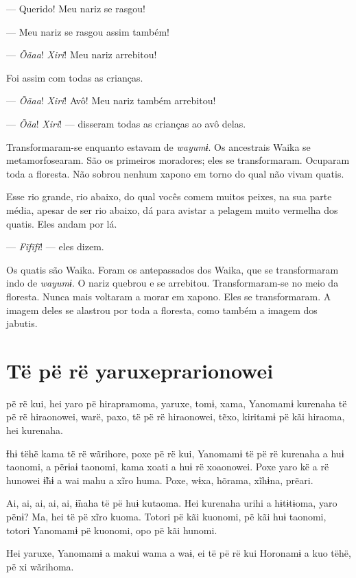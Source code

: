 --- Querido! Meu nariz se rasgou! 

--- Meu nariz se rasgou assim também!

--- \textit{Õãaa}! \textit{Xiri}! Meu nariz arrebitou! 

Foi assim com todas as crianças. 

--- \textit{Õãaa}! \textit{Xiri}! Avô! Meu nariz também arrebitou! 

--- \textit{Õãa}! \textit{Xiri}! --- disseram todas as crianças ao avô delas. 

Transformaram-se enquanto estavam de \textit{wayumɨ}. Os ancestrais Waika
se metamorfosearam. São os primeiros moradores; eles se transformaram.
Ocuparam toda a floresta. Não sobrou nenhum xapono em torno do qual não
vivam quatis. 

Esse rio grande, rio abaixo, do qual vocês comem muitos peixes, na sua
parte média, apesar de ser rio abaixo, dá para avistar a pelagem muito
vermelha dos quatis. Eles andam por lá. 

--- \textit{Fĩfĩfĩ}! --- eles dizem. 

Os quatis são Waika. Foram os antepassados dos Waika, que se
transformaram indo de \textit{wayumɨ}. O nariz quebrou e se arrebitou.
Transformaram-se no meio da floresta. Nunca mais voltaram a morar em
xapono. Eles se transformaram. A imagem deles se alastrou por toda a
floresta, como também a imagem dos jabutis.

\chapter{Të pë rë yaruxeprarionowei}

 pë rë kui, hei yaro pë hirapramoma, yaruxe, tomɨ, xama, Yanomamɨ
kurenaha të pë rë hiraonowei, warë, paxo, të pë rë hiraonowei, tẽxo,
kiritamɨ pë kãi hiraoma, hei kurenaha. 

Ɨhɨ tëhë kama të rë wãrihore, poxe pë rë kui, Yanomamɨ të pë rë kurenaha
a huɨ taonomi, a përɨaɨ taonomi, kama xoati a huɨ rë xoaonowei. Poxe
yaro kë a rë hunowei ɨ̃hɨ a wai mahu a xĩro huma. Poxe, wɨxa, hõrama,
xĩhɨna, prẽari. 

Ai, ai, ai, ai, ai, ɨ̃naha të pë huɨ kutaoma. Hei kurenaha urihi a
hɨtɨtɨoma, yaro pënɨ? Ma, hei të pë xĩro kuoma. Totori pë kãi kuonomi,
pë kãi huɨ taonomi, totori Yanomamɨ pë kuonomi, opo pë kãi hunomi. 

Hei yaruxe, Yanomamɨ a makui wama a waɨ, ei të pë rë kui Horonamɨ a kuo
tëhë, pë xi wãrihoma. 

